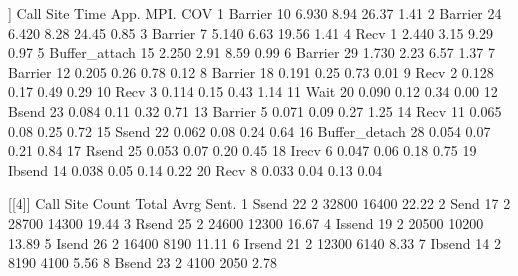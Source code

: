 \begin{Output}
[[3]]
            Call Site  Time App.  MPI.  COV
1        Barrier   10 6.930 8.94 26.37 1.41
2        Barrier   24 6.420 8.28 24.45 0.85
3        Barrier    7 5.140 6.63 19.56 1.41
4           Recv    1 2.440 3.15  9.29 0.97
5  Buffer_attach   15 2.250 2.91  8.59 0.99
6        Barrier   29 1.730 2.23  6.57 1.37
7        Barrier   12 0.205 0.26  0.78 0.12
8        Barrier   18 0.191 0.25  0.73 0.01
9           Recv    2 0.128 0.17  0.49 0.29
10          Recv    3 0.114 0.15  0.43 1.14
11          Wait   20 0.090 0.12  0.34 0.00
12         Bsend   23 0.084 0.11  0.32 0.71
13       Barrier    5 0.071 0.09  0.27 1.25
14          Recv   11 0.065 0.08  0.25 0.72
15         Ssend   22 0.062 0.08  0.24 0.64
16 Buffer_detach   28 0.054 0.07  0.21 0.84
17         Rsend   25 0.053 0.07  0.20 0.45
18         Irecv    6 0.047 0.06  0.18 0.75
19        Ibsend   14 0.038 0.05  0.14 0.22
20          Recv    8 0.033 0.04  0.13 0.04

[[4]]
    Call Site Count Total  Avrg Sent.
1  Ssend   22     2 32800 16400 22.22
2   Send   17     2 28700 14300 19.44
3  Rsend   25     2 24600 12300 16.67
4 Issend   19     2 20500 10200 13.89
5  Isend   26     2 16400  8190 11.11
6 Irsend   21     2 12300  6140  8.33
7 Ibsend   14     2  8190  4100  5.56
8  Bsend   23     2  4100  2050  2.78


\end{Output}
